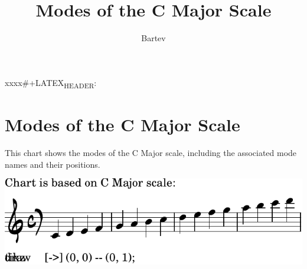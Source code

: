 \documentclass[11pt]{article}
\author{Bartev}
\date{}
\title{Modes of the C Major Scale}
\let\maketitle\relax %
\begin{document}
\maketitle
xxxx\#+LATEX\textsubscript{HEADER}: \usepackage{tikz}

\section*{Modes of the C Major Scale}
\label{sec:orgd21c7e0}

This chart shows the modes of the C Major scale, including the associated mode names and their positions.

\begin{center}
\includegraphics[width=.9\linewidth]{modes-c-major.pdf}
\end{center}
\end{document}
